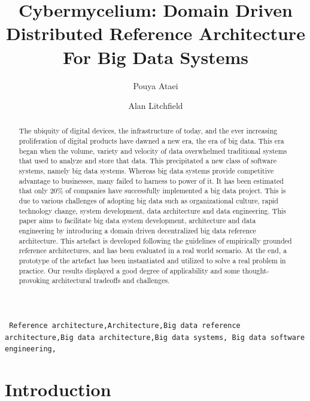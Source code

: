 \documentclass[review]{elsarticle}
\begin{document}
\begin{frontmatter}

\title{Cybermycelium: Domain Driven Distributed Reference Architecture For Big Data Systems}

\author{Pouya Ataei}
\author{Alan Litchfield}

\address[mymainaddress]{School of Engineering, Computer and Mathematical Sciences, Auckland University of Technology, Auckland, New Zealand}


\begin{abstract}
The ubiquity of digital devices, the infrastructure of today, and the ever increasing proliferation of digital products have dawned a new era, the era of big data. This era began when the volume, variety and velocity of data overwhelmed traditional systems that used to analyze and store that data. This precipitated a new class of software systems, namely big data systems. Whereas big data systems provide competitive advantage to businesses, many failed to harness to power of it. It has been estimated that only 20\% of companies have successfully implemented a big data project. This is due to various challenges of adopting big data such as organizational culture, rapid technology change, system development, data architecture and data engineering. This paper aims to facilitate big data system development, architecture and data engineering by introducing a domain driven decentralized big data reference architecture. This artefact is developed following the guidelines of empirically grounded reference architectures, and has been evaluated in a real world scenario. At the end, a prototype of the artefact has been instantiated and utilized to solve a real problem in practice. Our results displayed a good degree of applicability and some thought-provoking architectural tradeoffs and challenges.
\end{abstract}

\begin{keyword}
\texttt{ Reference architecture\sep Architecture\sep Big data
reference architecture\sep Big data architecture\sep Big data systems\sep
Big data software engineering\sep}
\end{keyword}

\end{frontmatter}

\linenumbers

\section{Introduction}
\end{document}
